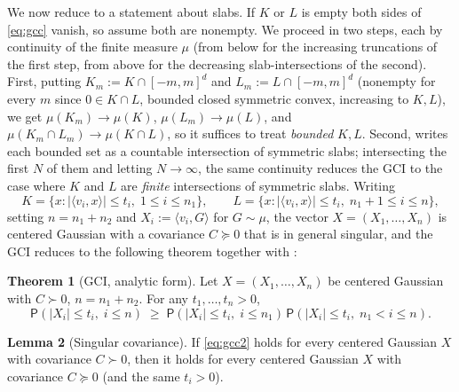 \documentclass[12pt,a4paper]{article}
\theoremstyle{definition}
\newtheorem{theorem}{Theorem}[section]
\newtheorem{lemma}[theorem]{Lemma}
\newcommand{\PP}{\mathsf{P}}
\begin{document}
We now reduce  to a statement about slabs.  If $K$ or
$L$ is empty both sides of \eqref{eq:gcc} vanish, so assume both are
nonempty.  We proceed in two steps, each by continuity of the finite measure
$\mu$ (from below for the increasing truncations of the first step, from
above for the decreasing slab-intersections of the second).  First, putting $K_m:=K\cap[-m,m]^d$ and $L_m:=L\cap[-m,m]^d$
(nonempty for every $m$ since $0\in K\cap L$, bounded closed symmetric convex, increasing to
$K,L$), we get $\mu(K_m)\to\mu(K)$, $\mu(L_m)\to\mu(L)$, and
$\mu(K_m\cap L_m)\to\mu(K\cap L)$, so it suffices to treat \emph{bounded}
$K,L$.  Second,  writes each bounded set as a
countable intersection of symmetric slabs; intersecting the first $N$ of
them and letting $N\to\infty$, the same continuity reduces the GCI to the
case where $K$ and $L$ are \emph{finite} intersections of symmetric
slabs.  Writing
\[
  K=\bigl\{x : |\langle v_i,x\rangle|\leqslant t_i,\;1\leqslant i\leqslant n_1\bigr\},
  \qquad
  L=\bigl\{x : |\langle v_i,x\rangle|\leqslant t_i,\;n_1{+}1\leqslant i\leqslant n\bigr\},
\]
setting $n=n_1+n_2$ and $X_i:=\langle v_i,G\rangle$ for $G\sim\mu$,
the vector $X=(X_1,\ldots,X_n)$ is centered Gaussian with a covariance
$C\succcurlyeq 0$ that is in general singular, and the GCI reduces to
the following theorem together with :

\begin{theorem}[GCI, analytic form]\label{thm:gcc2}
  Let $X=(X_1,\ldots,X_n)$ be centered Gaussian with $C\succ 0$,
  $n=n_1+n_2$.  For any $t_1,\ldots,t_n>0$,
  \begin{equation}\label{eq:gcc2}
    \PP(|X_i|\leqslant t_i,\;i\leqslant n)
    \;\geqslant\;
    \PP(|X_i|\leqslant t_i,\;i\leqslant n_1)\,
    \PP(|X_i|\leqslant t_i,\;n_1{<}i\leqslant n).
  \end{equation}
\end{theorem}

\begin{lemma}[Singular covariance]\label{lem:singular}
  If \eqref{eq:gcc2} holds for every centered Gaussian $X$ with
  covariance $C\succ 0$, then it holds for every centered Gaussian $X$
  with covariance $C\succcurlyeq 0$ (and the same $t_i>0$).
\end{lemma}
\end{document}
